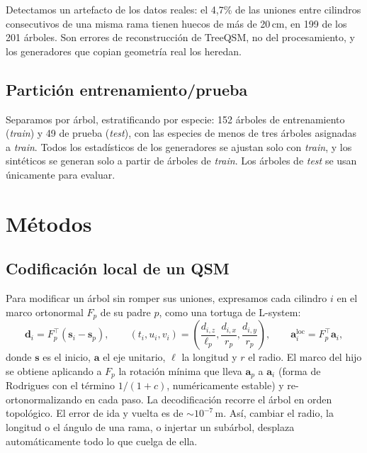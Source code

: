 \documentclass[11pt,a4paper]{article}
\begin{document}
Detectamos un artefacto de los datos reales: el 4,7\% de las uniones entre cilindros consecutivos de una misma rama tienen huecos de más de 20\,cm, en 199 de los 201 árboles. Son errores de reconstrucción de TreeQSM, no del procesamiento, y los generadores que copian geometría real los heredan.

\subsection{Partición entrenamiento/prueba}
Separamos por árbol, estratificando por especie: 152 árboles de entrenamiento (\emph{train}) y 49 de prueba (\emph{test}), con las especies de menos de tres árboles asignadas a \emph{train}. Todos los estadísticos de los generadores se ajustan solo con \emph{train}, y los sintéticos se generan solo a partir de árboles de \emph{train}. Los árboles de \emph{test} se usan únicamente para evaluar.

\section{Métodos}

\subsection{Codificación local de un QSM}
Para modificar un árbol sin romper sus uniones, expresamos cada cilindro $i$ en el marco ortonormal $F_p$ de su padre $p$, como una tortuga de L-system:
\begin{equation}
\mathbf{d}_i = F_p^{\top}(\mathbf{s}_i - \mathbf{s}_p), \qquad
(t_i, u_i, v_i) = \left(\frac{d_{i,z}}{\ell_p}, \frac{d_{i,x}}{r_p}, \frac{d_{i,y}}{r_p}\right), \qquad
\mathbf{a}_i^{\text{loc}} = F_p^{\top}\mathbf{a}_i ,
\end{equation}
donde $\mathbf{s}$ es el inicio, $\mathbf{a}$ el eje unitario, $\ell$ la longitud y $r$ el radio. El marco del hijo se obtiene aplicando a $F_p$ la rotación mínima que lleva $\mathbf{a}_p$ a $\mathbf{a}_i$ (forma de Rodrigues con el término $1/(1+c)$, numéricamente estable) y re-ortonormalizando en cada paso. La decodificación recorre el árbol en orden topológico. El error de ida y vuelta es de $\sim\!10^{-7}$\,m. Así, cambiar el radio, la longitud o el ángulo de una rama, o injertar un subárbol, desplaza automáticamente todo lo que cuelga de ella.
\end{document}

